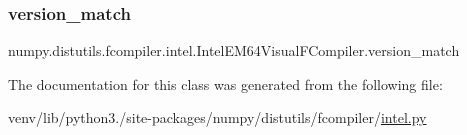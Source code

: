 \subsubsection{\texorpdfstring{version\+\_\+match}{version\_match}}
{\footnotesize\ttfamily numpy.\+distutils.\+fcompiler.\+intel.\+Intel\+E\+M64\+Visual\+F\+Compiler.\+version\+\_\+match\hspace{0.3cm}{\ttfamily [static]}}



The documentation for this class was generated from the following file\+:\begin{DoxyCompactItemize}
\item 
venv/lib/python3./site-\/packages/numpy/distutils/fcompiler/\hyperlink{intel_8py}{intel.\+py}\end{DoxyCompactItemize}
